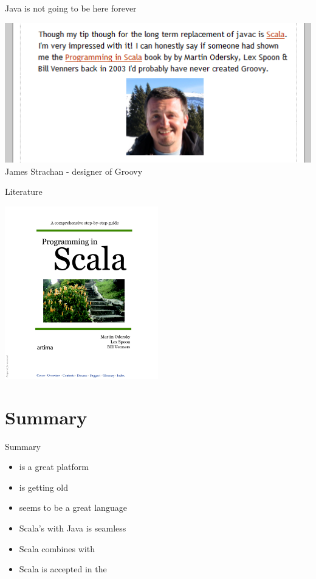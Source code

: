 \begin{frame}{Java is not going to be here forever}
\begin{center}
\includegraphics[scale=0.8]{resources/JamesStrachanScala.png}\\
James Strachan - designer of Groovy
\end{center}
\end{frame}

\begin{frame}{Literature}
\begin{center}
\includegraphics[width=0.5\textwidth]{resources/ProgrammingInScala.png}
\end{center}
\end{frame}

\section{Summary}
\begin{frame}{Summary}
\begin{itemize}
  \item {} is a great platform
  \item {} is getting old
  \item {} seems to be a great language
  \item Scala's  with Java is seamless
  \item Scala combines  with 
  \item Scala is accepted in the 
\end{itemize}
\end{frame}







